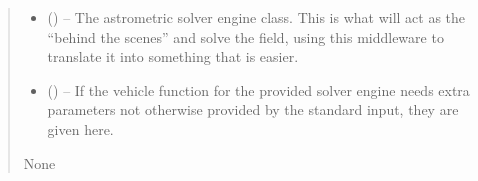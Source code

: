 \documentclass[letterpaper,11pt,english]{sphinxmanual}
\begin{document}
\begin{savenotes}
\begin{fulllineitems}
\begin{savenotes}
\begin{fulllineitems}
\begin{quote}
\begin{description}
\begin{itemize}
\item {} 
\sphinxAtStartPar
{} ({\hyperref[\detokenize{code/opihiexarata.library.engine:opihiexarata.library.engine.AstrometryEngine}]{}}) – The astrometric solver engine class. This is what will act as the
“behind the scenes” and solve the field, using this middleware to
translate it into something that is easier.

\item {} 
\sphinxAtStartPar
{} () – If the vehicle function for the provided solver engine needs
extra parameters not otherwise provided by the standard input,
they are given here.

\end{itemize}

\sphinxAtStartPar
None

\end{description}\end{quote}

\end{fulllineitems}\end{savenotes}



\end{fulllineitems}
\end{savenotes}
\end{document}
